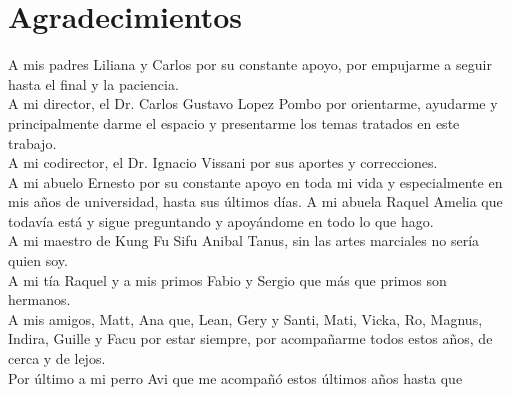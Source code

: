 \chapter*{Agradecimientos}

A mis padres Liliana y Carlos por su constante apoyo, por empujarme a seguir hasta el final y la paciencia.\\
A mi director, el Dr. Carlos Gustavo Lopez Pombo por orientarme, ayudarme y principalmente darme el espacio y presentarme los temas tratados en este trabajo.\\
A mi codirector, el Dr. Ignacio Vissani por sus aportes y correcciones.\\
A mi abuelo Ernesto por su constante apoyo en toda mi vida y especialmente en mis años de universidad, hasta sus últimos días. A mi abuela Raquel Amelia que todavía está y sigue preguntando y apoyándome en todo lo que hago.\\
A mi maestro de Kung Fu Sifu Anibal Tanus, sin las artes marciales no sería quien soy.\\
A mi tía Raquel y a mis primos Fabio y Sergio que más que primos son hermanos. \\
A mis amigos, Matt, Ana que, Lean, Gery y Santi, Mati, Vicka, Ro, Magnus, Indira, Guille y Facu por estar siempre, por acompañarme todos estos años, de cerca y de lejos.\\
Por último a mi perro Avi que me acompañó estos últimos años hasta que 